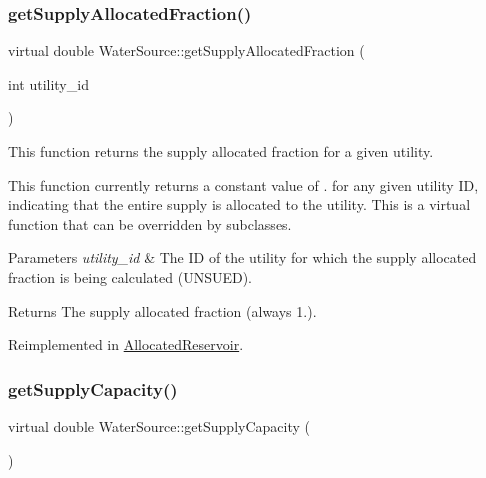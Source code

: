\mbox{\label{classWaterSource_a484bca192a9e3aacaad47db0afb8fbdd}} 
\subsubsection{\texorpdfstring{get\+Supply\+Allocated\+Fraction()}{getSupplyAllocatedFraction()}}
{\footnotesize\ttfamily virtual double Water\+Source\+::get\+Supply\+Allocated\+Fraction (\begin{DoxyParamCaption}\item[{int}]{utility\+\_\+id }\end{DoxyParamCaption})\hspace{0.3cm}{\ttfamily [virtual]}}



This function returns the supply allocated fraction for a given utility. 

This function currently returns a constant value of {.} for any given utility ID, indicating that the entire supply is allocated to the utility. This is a virtual function that can be overridden by subclasses.


\begin{DoxyParams}{Parameters}
{\em utility\+\_\+id} & The ID of the utility for which the supply allocated fraction is being calculated (U\+N\+S\+U\+ED).\\
\hline
\end{DoxyParams}
\begin{DoxyReturn}{Returns}
The supply allocated fraction (always 1.). 
\end{DoxyReturn}


Reimplemented in \mbox{\hyperlink{classAllocatedReservoir_a114e9cde6a106b786ca0ed39283cbbed}{Allocated\+Reservoir}}.

\mbox{\label{classWaterSource_aeefcddb0119d5aab95dab03912a65cad}} 
\subsubsection{\texorpdfstring{get\+Supply\+Capacity()}{getSupplyCapacity()}}
{\footnotesize\ttfamily virtual double Water\+Source\+::get\+Supply\+Capacity (\begin{DoxyParamCaption}{ }\end{DoxyParamCaption})\hspace{0.3cm}{\ttfamily [virtual]}}



